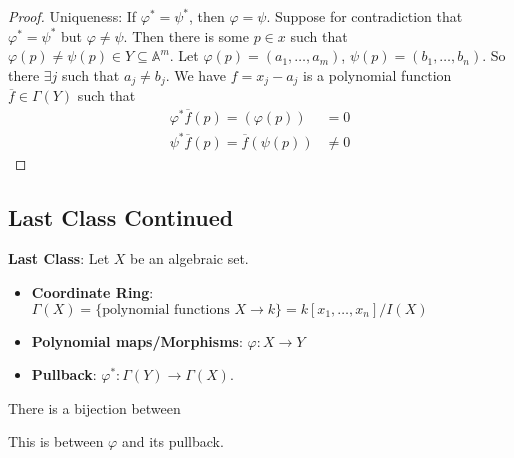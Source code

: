 \documentclass{report}
\begin{document}
\begin{proof}
        Uniqueness: If $\varphi^{*} = \psi^{*}$, then $\varphi = \psi$. Suppose for contradiction that $\varphi^{*} = \psi^{*}$ but $\varphi \neq \psi$. Then there is some $p \in x$ such that $\varphi(p) \neq \psi(p) \in Y \subseteq \mathbb{A}^{m}$. Let $\varphi(p) = (a_{1}, \ldots , a_{m})$, $\psi(p) = (b_{1}, \ldots , b_{n})$. So there $\exists j$ such that $a_{j} \neq b_{j}$. We have $f = x_{j} - a_{j}$ is a polynomial function $\overline{f} \in \Gamma(Y)$ such that
            \begin{align*}
                \varphi^{*}\overline{f}(p) = (\varphi(p)) &= 0 \\
                \psi^{*}\overline{f}(p) = \overline{f}(\psi(p)) &\neq 0
            \end{align*}
    \end{proof}

\begin{topic}
    \section{Last Class Continued}
\end{topic}

\textbf{Last Class}: Let $X$ be an algebraic set.
    \begin{itemize}
        \item \textbf{Coordinate Ring}: $\Gamma(X) = \{\text{polynomial functions $X \rightarrow k$}\} = k[x_{1}, \ldots , x_{n}]/I(X)$ 

        \item \textbf{Polynomial maps/Morphisms}: $\varphi : X \rightarrow Y$

        \item \textbf{Pullback}: $\varphi^{*} : \Gamma(Y) \rightarrow \Gamma(X)$. 
    \end{itemize}

There is a bijection between
    \begin{center}
    \end{center}
This is between $\varphi$ and its pullback.
\end{document}
